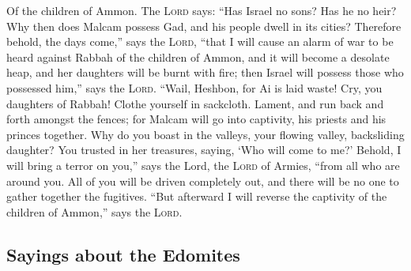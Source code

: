  Of the children of Ammon. The \textsc{Lord} says: ``Has
Israel no sons? Has he no heir? Why then does Malcam possess Gad, and
his people dwell in its cities?  Therefore behold, the
days come,'' says the \textsc{Lord}, ``that I will cause an alarm of war
to be heard against Rabbah of the children of Ammon, and it will become
a desolate heap, and her daughters will be burnt with fire; then Israel
will possess those who possessed him,'' says the \textsc{Lord}.
 ``Wail, Heshbon, for Ai is laid waste! Cry, you daughters
of Rabbah! Clothe yourself in sackcloth. Lament, and run back and forth
amongst the fences; for Malcam will go into captivity, his priests and
his princes together.  Why do you boast in the valleys,
your flowing valley, backsliding daughter? You trusted in her treasures,
saying, `Who will come to me?'  Behold, I will bring a
terror on you,'' says the Lord, the \textsc{Lord} of Armies, ``from all
who are around you. All of you will be driven completely out, and there
will be no one to gather together the fugitives.  ``But
afterward I will reverse the captivity of the children of Ammon,'' says
the \textsc{Lord}.

\hypertarget{sayings-about-the-edomites}{%
\subsection{Sayings about the
Edomites}\label{sayings-about-the-edomites}}

